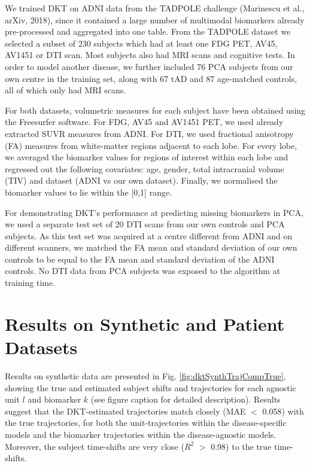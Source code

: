 \documentclass{llncs}
\begin{document}
We trained DKT on ADNI data from the TADPOLE challenge (Marinescu et al., arXiv, 2018), since it contained a large number of multimodal biomarkers already pre-processed and aggregated into one table. From the TADPOLE dataset we selected a subset of 230 subjects which had at least one FDG PET, AV45, AV1451 or DTI scan. Most subjects also had MRI scans and cognitive tests. In order to model another disease, we further included 76 PCA subjects from our own centre in the training set, along with 67 tAD and 87 age-matched controls, all of which only had MRI scans.
 
For both datasets, volumetric measures for each subject have been obtained using the Freesurfer software. For FDG, AV45 and AV1451 PET, we used already extracted SUVR measures from ADNI. For DTI, we used fractional anisotropy (FA) measures from white-matter regions adjacent to each lobe. For every lobe, we averaged the biomarker values for regions of interest within each lobe and regressed out the following covariates: age, gender, total intracranial volume (TIV) and dataset (ADNI vs our own dataset). Finally, we normalised the biomarker values to lie within the [0,1] range. 

For demonstrating DKT's performance at predicting missing biomarkers in PCA, we used a separate test set of 20 DTI scans from our own controls and PCA subjects. As this test set was acquired at a centre different from ADNI and on different scanners, we matched the FA mean and standard deviation of our own controls to be equal to the FA mean and standard deviation of the ADNI controls. No DTI data from PCA subjects was exposed to the algorithm at training time.



\section{Results on Synthetic and Patient Datasets}
\label{sec:dktRes}

Results on synthetic data are presented in Fig. \ref{fig:dktSynthTrajCompTrue}, showing the true and estimated subject shifts and trajectories for each agnostic unit $l$ and biomarker $k$ (see figure caption for detailed description). Results suggest that the DKT-estimated trajectories match closely (MAE $<$ 0.058) with the true trajectories, for both the unit-trajectories within the disease-specific models and the biomarker trajectories within the disease-agnostic models. Moreover, the subject time-shifts are very close ($R^2$ $>$ 0.98) to the true time-shifts. 
\end{document}
